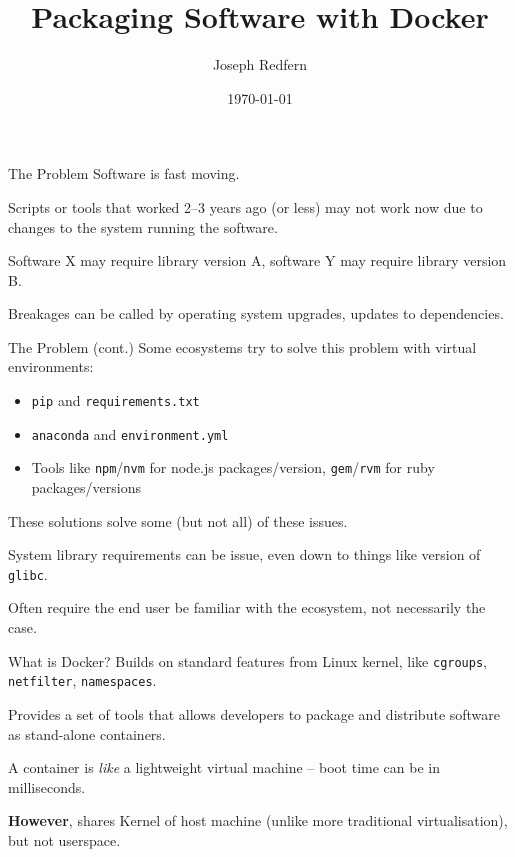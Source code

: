\documentclass[10pt]{beamer}
\title{Packaging Software with Docker}
\date{\today}
\author{Joseph Redfern}
\begin{document}
\maketitle

\begin{frame}[fragile]{The Problem}
	\vfill Software is fast moving. 

	\vfill Scripts or tools that worked 2--3 years ago (or less) may not work now due to changes to the system running the software.

	\vfill Software X may require library version A, software Y may require library version B.

	\vfill Breakages can be called by operating system upgrades, updates to dependencies.

\end{frame}

\begin{frame}[fragile]{The Problem (cont.)}
	\vfill Some ecosystems try to solve this problem with virtual environments:

	\vfill \begin{itemize}
	\item \verb|pip| and \verb|requirements.txt| 
	\item \verb|anaconda| and \verb|environment.yml|
	\item Tools like \verb|npm|/\verb|nvm| for node.js packages/version, \verb|gem|/\verb|rvm| for ruby packages/versions
	\end{itemize}

	\vfill These solutions solve some (but not all) of these issues.

	System library requirements can be issue, even down to things like version of \verb|glibc|.

	Often require the end user be familiar with the ecosystem, not necessarily the case.
\end{frame}

\begin{frame}[fragile]{What is Docker?}
	\vfill Builds on standard features from Linux kernel, like \verb|cgroups|, \verb|netfilter|, \verb|namespaces|.

	\vfill Provides a set of tools that allows developers to package and distribute software as stand-alone containers.

	\vfill A container is \textit{like} a lightweight virtual machine -- boot time can be in milliseconds.

	\vfill \textbf{However}, shares Kernel of host machine (unlike more traditional virtualisation), but not userspace.

\end{frame}
\end{document}
